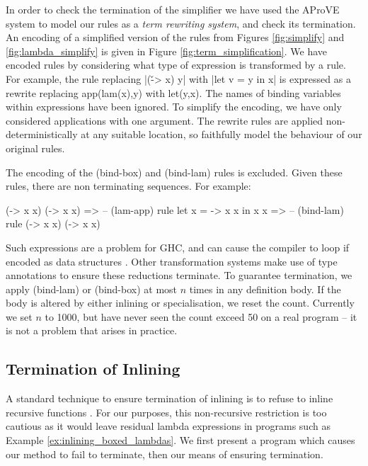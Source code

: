 \documentclass[preprint]{sigplanconf}
\begin{document}
In order to check the termination of the simplifier we have used the AProVE system \cite{aprove} to model our rules as a \textit{term rewriting system}, and check its termination. An encoding of a simplified version of the rules from Figures \ref{fig:simplify} and \ref{fig:lambda_simplify} is given in Figure \ref{fig:term_simplification}. We have encoded rules by considering what type of expression is transformed by a rule. For example, the rule replacing |(\v -> x) y| with |let v = y in x| is expressed as a rewrite replacing \textsf{app(lam(x),y)} with \textsf{let(y,x)}. The names of binding variables within expressions have been ignored. To simplify the encoding, we have only considered applications with one argument. The rewrite rules are applied non-deterministically at any suitable location, so faithfully model the behaviour of our original rules.

The encoding of the (bind-box) and (bind-lam) rules is excluded. Given these rules, there are non terminating sequences. For example:

\begin{onepage}
\ignore\begin{code}
(\x -> x x) (\x -> x x)
   => -- (lam-app) rule
let x = \x -> x x in x x
   => -- (bind-lam) rule
(\x -> x x) (\x -> x x)
\end{code}
\end{onepage}

Such expressions are a problem for GHC, and can cause the compiler to loop if encoded as data structures \cite{spj:inlining}. Other transformation systems \cite{chin:higher_order_removal} make use of type annotations to ensure these reductions terminate. To guarantee termination, we apply (bind-lam) or (bind-box) at most $n$ times in any definition body. If the body is altered by either inlining or specialisation, we reset the count. Currently we set $n$ to 1000, but have never seen the count exceed 50 on a real program -- it is not a problem that arises in practice.

\subsection{Termination of Inlining}

A standard technique to ensure termination of inlining is to refuse to inline recursive functions \cite{spj:inlining}. For our purposes, this non-recursive restriction is too cautious as it would leave residual lambda expressions in programs such as Example \ref{ex:inlining_boxed_lambdas}. We first present a program which causes our method to fail to terminate, then our means of ensuring termination.
\end{document}
